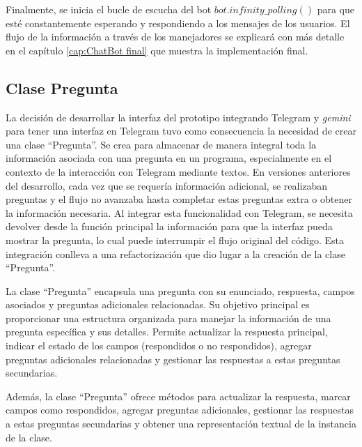 Finalmente, se inicia el bucle de escucha del bot $bot.infinity\_polling()$ para que esté constantemente esperando y respondiendo a los mensajes de los usuarios. El flujo de la información a través de los manejadores se explicará con más detalle en el capítulo \ref{cap:ChatBot final} que muestra la implementación final. 

\subsection{Clase Pregunta}
La decisión de desarrollar la interfaz del prototipo integrando Telegram y \textit{gemini} para tener una interfaz en Telegram tuvo como consecuencia la necesidad de crear una clase ``Pregunta''. Se crea para almacenar de manera integral toda la información asociada con una pregunta en un programa, especialmente en el contexto de la interacción con Telegram mediante textos. En versiones anteriores del desarrollo, cada vez que se requería información adicional, se realizaban preguntas y el flujo no avanzaba hasta completar estas preguntas extra o obtener la información necesaria. Al integrar esta funcionalidad con Telegram, se necesita devolver desde la función principal la información para que la interfaz pueda mostrar la pregunta, lo cual puede interrumpir el flujo original del código. Esta integración conlleva a una refactorización que dio lugar a la creación de la clase ``Pregunta''.

La clase ``Pregunta'' encapsula una pregunta con su enunciado, respuesta, campos asociados y preguntas adicionales relacionadas. Su objetivo principal es proporcionar una estructura organizada para manejar la información de una pregunta específica y sus detalles. Permite actualizar la respuesta principal, indicar el estado de los campos (respondidos o no respondidos), agregar preguntas adicionales relacionadas y gestionar las respuestas a estas preguntas secundarias.

Además, la clase ``Pregunta'' ofrece métodos para actualizar la respuesta, marcar campos como respondidos, agregar preguntas adicionales, gestionar las respuestas a estas preguntas secundarias y obtener una representación textual de la instancia de la clase.

